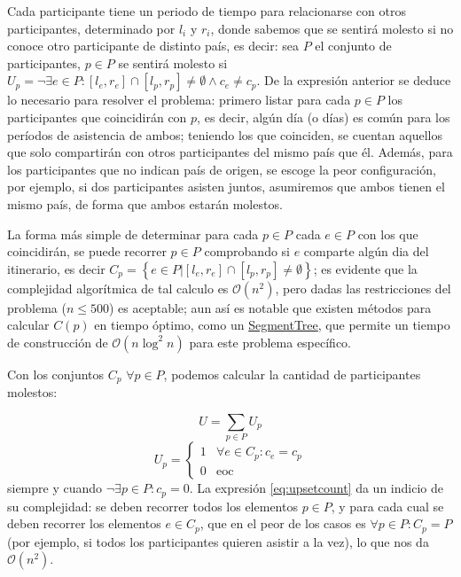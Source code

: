 Cada participante tiene un periodo de tiempo para relacionarse con otros participantes, determinado por \(l_i\) y \(r_i\), donde sabemos que se sentirá molesto si no conoce otro participante de distinto país, es decir: sea \(P\) el conjunto de participantes, \(p\in P\) se sentirá molesto si \(U_p=\lnot\exists e\in P:\left[l_e,r_e\right]\cap\left[l_p,r_p\right]\neq\emptyset\wedge c_e\ne c_p\). De la expresión anterior se deduce lo necesario para resolver el problema: primero listar para cada \(p\in P\) los participantes que coincidirán con \(p\), es decir, algún día (o días) es común para los períodos de asistencia de ambos; teniendo los que coinciden, se cuentan aquellos que solo compartirán con otros participantes del mismo país que él. Además, para los participantes que no indican país de origen, se escoge la peor configuración, por ejemplo, si dos participantes asisten juntos, asumiremos que ambos tienen el mismo país, de forma que ambos estarán molestos.

La forma más simple de determinar para cada \(p\in P\) cada \(e\in P\) con los que coincidirán, se puede recorrer \(p\in P\) comprobando si \(e\) comparte algún dia del itinerario, es decir \(C_p=\left\{e\in P|\left[l_e,r_e\right]\cap\left[l_p,r_p\right]\neq\emptyset\right\}\); es evidente que la complejidad algorítmica de tal calculo es \(\mathcal{O}(n^2)\), pero dadas las restricciones del problema (\(n\leq500\)) es aceptable; aun así es notable que existen métodos para calcular \(C(p)\) en tiempo óptimo, como un \href{https://en.wikipedia.org/wiki/Segment_tree}{SegmentTree}, que permite un tiempo de construcción de \(\mathcal{O}(n\log^2{n})\) para este problema específico.

Con los conjuntos \(C_p\) \(\forall p\in P\), podemos calcular la cantidad de participantes molestos:

\begin{equation}
  U=\sum_{p\in P}{U_p}
  \label{eq:upsetcount}
\end{equation}
\begin{equation*}
  U_p=\begin{cases}
    1 & \forall e\in C_p:c_e=c_p \\
    0 & \text{eoc}
  \end{cases}
\end{equation*}
siempre y cuando \(\lnot\exists p\in P:c_p=0\). La expresión \eqref{eq:upsetcount} da un indicio de su complejidad: se deben recorrer todos los elementos \(p\in P\), y para cada cual se deben recorrer los elementos \(e\in C_p\), que en el peor de los casos es \(\forall p\in P:C_p=P\) (por ejemplo, si todos los participantes quieren asistir a la vez), lo que nos da \(\mathcal{O}(n^2)\).

